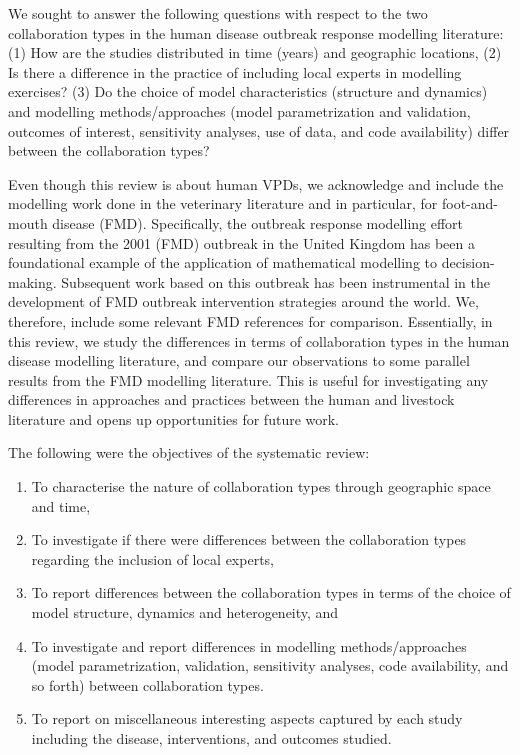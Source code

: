\documentclass[10pt,letterpaper]{article}
\begin{document}
We sought to answer the following questions with respect to the two collaboration types in the human disease outbreak response modelling literature: (1) How are the studies distributed in time (years) and geographic locations, (2) Is there a difference in the practice of including local experts in modelling exercises? (3) Do the choice of model characteristics (structure and dynamics) and modelling methods/approaches (model parametrization and validation, outcomes of interest, sensitivity analyses, use of data, and code availability) differ between the collaboration types?    

Even though this review is about human VPDs, we acknowledge and include the modelling work done in the veterinary literature and in particular, for foot-and-mouth disease (FMD). Specifically, the outbreak response modelling effort resulting from the 2001 (FMD) outbreak in the United Kingdom has been a foundational example of the application of mathematical modelling to decision-making. Subsequent work based on this outbreak has been instrumental in the development of FMD outbreak intervention strategies around the world. We, therefore, include some relevant FMD references for comparison. Essentially, in this review, we study the differences in terms of collaboration types in the human disease modelling literature, and compare our observations to some parallel results from the FMD modelling literature. This is useful for investigating any differences in approaches and practices between the human and livestock literature and opens up opportunities for future work. 

   
The following were the objectives of the systematic review:
\begin{enumerate}
	\item To characterise the nature of collaboration types through geographic space and time,
	\item To investigate if there were differences between the collaboration types regarding the inclusion of local experts,
	\item To report differences between the collaboration types in terms of the choice of model structure, dynamics and heterogeneity, and
	\item To investigate and report differences in modelling methods/approaches (model parametrization, validation, sensitivity analyses, code availability, and so forth) between collaboration types.
	\item To report on miscellaneous interesting aspects captured by each study including the disease, interventions, and outcomes studied.
\end{enumerate}
\end{document}
